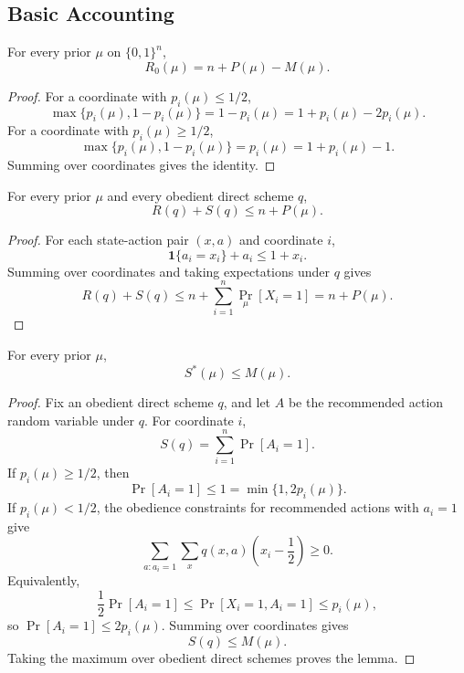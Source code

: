 \documentclass[format=acmsmall, review=false]{acmart}
\begin{document}
\subsection{Basic Accounting}

\begin{lemma}
\label{lem:prior-utility-identity}
For every prior $\mu$ on $\{0,1\}^n$,
\[
R_0(\mu)=n+P(\mu)-M(\mu).
\]
\end{lemma}

\begin{proof}
For a coordinate with $p_i(\mu)\leq 1/2$,
\[
\max\{p_i(\mu),1-p_i(\mu)\}
=1-p_i(\mu)=1+p_i(\mu)-2p_i(\mu).
\]
For a coordinate with $p_i(\mu)\geq 1/2$,
\[
\max\{p_i(\mu),1-p_i(\mu)\}
=p_i(\mu)=1+p_i(\mu)-1.
\]
Summing over coordinates gives the identity.
\end{proof}

\begin{lemma}
\label{lem:sender-receiver-tradeoff}
For every prior $\mu$ and every obedient direct scheme $q$,
\[
R(q)+S(q)\leq n+P(\mu).
\]
\end{lemma}

\begin{proof}
For each state-action pair $(x,a)$ and coordinate $i$,
\[
\mathbf{1}\{a_i=x_i\}+a_i\leq 1+x_i.
\]
Summing over coordinates and taking expectations under $q$ gives
\[
R(q)+S(q)\leq n+\sum_{i=1}^n \Pr_\mu[X_i=1]=n+P(\mu).
\]
\end{proof}

\begin{lemma}
\label{lem:sender-coordinate-upper-bound}
For every prior $\mu$,
\[
S^*(\mu)\leq M(\mu).
\]
\end{lemma}

\begin{proof}
Fix an obedient direct scheme $q$, and let $A$ be the recommended action random
variable under $q$. For coordinate $i$,
\[
S(q)=\sum_{i=1}^n \Pr[A_i=1].
\]
If $p_i(\mu)\geq 1/2$, then
\[
\Pr[A_i=1]\leq 1=\min\{1,2p_i(\mu)\}.
\]
If $p_i(\mu)<1/2$, the obedience constraints for recommended actions with
$a_i=1$ give
\[
\sum_{a:a_i=1}\sum_x q(x,a)\left(x_i-\frac12\right)\geq 0.
\]
Equivalently,
\[
\frac12\Pr[A_i=1]\leq \Pr[X_i=1,A_i=1]\leq p_i(\mu),
\]
so $\Pr[A_i=1]\leq 2p_i(\mu)$. Summing over coordinates gives
\[
S(q)\leq M(\mu).
\]
Taking the maximum over obedient direct schemes proves the lemma.
\end{proof}
\end{document}
